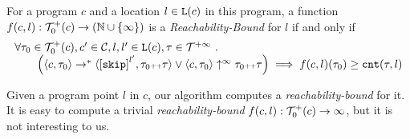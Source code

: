 \begin{defn}
  \label{def:rb}
  For a program ${c}$ and a location $l \in \mathtt{L}(c)$ in this program,
a function $f(c, l) : \mathcal{T}^{+}_0(c) \to (\mathbb{N} \cup \{\infty\})$ is a \emph{Reachability-Bound} for $l$ if and only if
{\small
\[
\begin{array}{l}
  \forall \trace_0 \in \ftdom_0(c), c' \in \cdom, l, l' \in \lvar(c), \trace \in \tdom \st 
  \\ \qquad
  \Big(
    \config{{c}, \trace_0} \to^{*} \config{\clabel{\eskip}^{l'}, \trace_0 \tracecat \trace} 
    \lor 
    \config{{c}, \trace_0} \uparrow^{\infty} \trace_0 \tracecat \trace 
  \Big)
  \implies f({c}, l)(\trace_0) \geq \counter(\trace, l) 
  \end{array}
  \]
}
\end{defn}
Given a program point $l$ in $c$, our algorithm computes a \emph{reachability-bound} for it.
It is easy to compute a trivial \emph{reachability-bound} $f(c, l): \mathcal{T}^{+}_0(c) \to \infty$, but it is not interesting to us.
